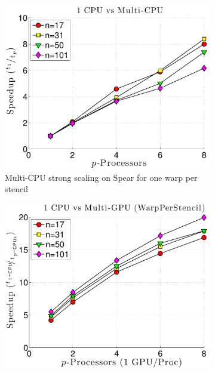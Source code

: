 \begin{figure}
\centering
\begin{subfigure}[t]{0.425\textwidth}
\centering
\includegraphics[width=1.0\textwidth]{../figures/spear_results/vortex/speedup_1CPU_vs_NCPU-eps-converted-to.pdf}
\caption{Multi-CPU strong scaling on Spear for one warp per stencil}
\label{fig:spear_alltoall_multicpu_scaling}
\end{subfigure} 
\begin{subfigure}[t]{0.425\textwidth}
\centering
\includegraphics[width=1.0\textwidth]{../figures/spear_results/vortex/speedup_1CPU_vs_NGPU_WarpPerStencil-eps-converted-to.pdf}

\end{subfigure}
\end{figure}
